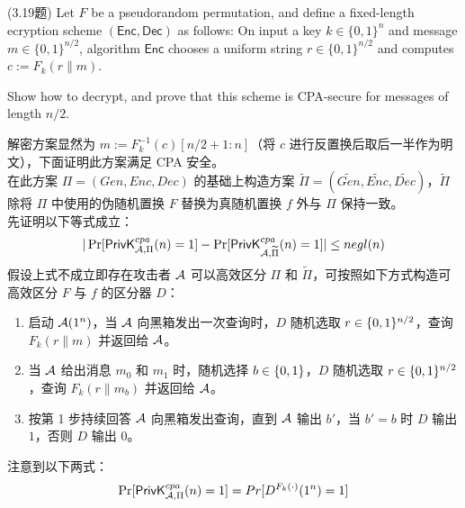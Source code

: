 \begin{questions}
    \question (3.19题) Let $F$ be a pseudorandom permutation, and define a fixed-length ecryption scheme $(\textsf{Enc},\textsf{Dec})$ as follows: On input a key $k\in\{0,1\}^n$ and message $m\in\{0,1\}^{n/2}$, algorithm $\textsf{Enc}$ chooses a uniform string $r\in\{0,1\}^{n/2}$ and computes $c:=F_k(r\parallel{m})$.

        Show how to decrypt, and prove that this scheme is CPA-secure for messages of length $n/2$.

        \begin{solution}
            \newline
            解密方案显然为 $m:=F_k^{-1}(c)[n/2+1:n]$（将 $c$ 进行反置换后取后一半作为明文），下面证明此方案满足 CPA 安全。\\
            在此方案 $\Pi=(Gen,Enc,Dec)$ 的基础上构造方案 $\widetilde{\Pi}=(\widetilde{Gen},\widetilde{Enc},\widetilde{Dec})$，$\widetilde{\Pi}$ 除将 $\Pi$ 中使用的伪随机置换 $F$ 替换为真随机置换 $f$ 外与 $\Pi$ 保持一致。\\
            先证明以下等式成立：
            \begin{equation}
                \label{equal-1}
                \begin{aligned}
                    |\Pr[\mathsf{PrivK}^{cpa}_{\mathcal{A},\Pi}(n)=1]-\Pr[\mathsf{PrivK}^{cpa}_{\mathcal{A},\widetilde{\Pi}}(n)=1]|\leq{negl}(n)
                \end{aligned}
            \end{equation}
            假设上式不成立即存在攻击者 $\mathcal{A}$ 可以高效区分 $\Pi$ 和 $\widetilde{\Pi}$，可按照如下方式构造可高效区分 $F$ 与 $f$ 的区分器 $D$：
            \begin{enumerate}
                \item 启动 $\mathcal{A}(1^n)$，当 $\mathcal{A}$ 向黑箱发出一次查询时，$D$ 随机选取 $r\in\{{0,1}\}^{n/2}$，查询 $F_k(r\parallel{m})$ 并返回给 $\mathcal{A}$。
                \item 当 $\mathcal{A}$ 给出消息 $m_0$ 和 $m_1$ 时，随机选择 $b\in\{{0,1}\}$，$D$ 随机选取 $r\in\{{0,1}\}^{n/2}$，查询 $F_k(r\parallel{m_b})$ 并返回给 $\mathcal{A}$。
                \item 按第 1 步持续回答 $\mathcal{A}$ 向黑箱发出查询，直到 $\mathcal{A}$ 输出 $b'$，当 $b'=b$ 时 $D$ 输出 $1$，否则 $D$ 输出 $0$。
            \end{enumerate}
            注意到以下两式：
            \begin{equation}
                \begin{aligned}
                   \Pr[\algo{PrivK}^{cpa}_{\AdvA,\Pi}(n)=1]=Pr[D^{F_k(\cdot)}(1^n)=1]

\end{aligned}
\end{equation}
\end{solution}
\end{questions}
